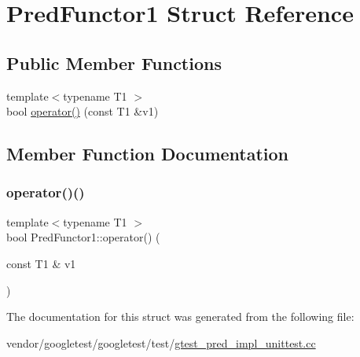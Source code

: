 \hypertarget{struct_pred_functor1}{}\section{Pred\+Functor1 Struct Reference}
\label{struct_pred_functor1}
\subsection*{Public Member Functions}
\begin{DoxyCompactItemize}
\item 
{\footnotesize template$<$typename T1 $>$ }\\bool \hyperlink{struct_pred_functor1_a78d81d1bac0ee7f81ea631c49bfab3e2}{operator()} (const T1 \&v1)
\end{DoxyCompactItemize}


\subsection{Member Function Documentation}
\mbox{\label{struct_pred_functor1_a78d81d1bac0ee7f81ea631c49bfab3e2}} 
\subsubsection{\texorpdfstring{operator()()}{operator()()}}
{\footnotesize\ttfamily template$<$typename T1 $>$ \\
bool Pred\+Functor1\+::operator() (\begin{DoxyParamCaption}\item[{const T1 \&}]{v1 }\end{DoxyParamCaption})\hspace{0.3cm}{\ttfamily [inline]}}



The documentation for this struct was generated from the following file\+:\begin{DoxyCompactItemize}
\item 
vendor/googletest/googletest/test/\hyperlink{gtest__pred__impl__unittest_8cc}{gtest\+\_\+pred\+\_\+impl\+\_\+unittest.\+cc}\end{DoxyCompactItemize}
